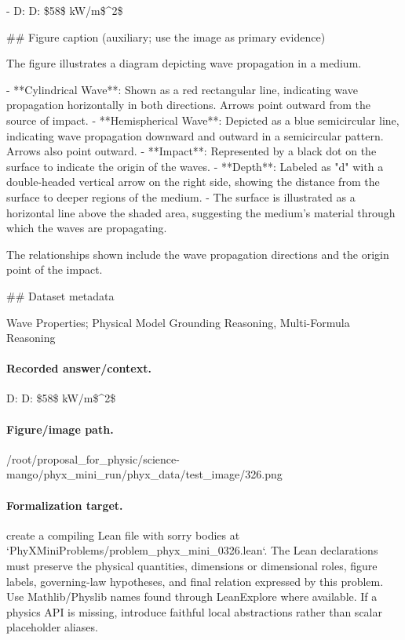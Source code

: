 - D: D: \$58\$ kW/m\$\textasciicircum{}2\$

\#\# Figure caption (auxiliary; use the image as primary evidence)

The figure illustrates a diagram depicting wave propagation in a medium.

- **Cylindrical Wave**: Shown as a red rectangular line, indicating wave propagation horizontally in both directions. Arrows point outward from the source of impact.
- **Hemispherical Wave**: Depicted as a blue semicircular line, indicating wave propagation downward and outward in a semicircular pattern. Arrows also point outward.
- **Impact**: Represented by a black dot on the surface to indicate the origin of the waves.
- **Depth**: Labeled as "d" with a double-headed vertical arrow on the right side, showing the distance from the surface to deeper regions of the medium.
- The surface is illustrated as a horizontal line above the shaded area, suggesting the medium's material through which the waves are propagating.

The relationships shown include the wave propagation directions and the origin point of the impact.

\#\# Dataset metadata

Wave Properties; Physical Model Grounding Reasoning, Multi-Formula Reasoning

\paragraph{Recorded answer/context.}
D: D: \$58\$ kW/m\$\textasciicircum{}2\$

\paragraph{Figure/image path.}
/root/proposal\_for\_physic/science-mango/phyx\_mini\_run/phyx\_data/test\_image/326.png

\paragraph{Formalization target.}
create a compiling Lean file with sorry bodies at `PhyXMiniProblems/problem\_phyx\_mini\_0326.lean`. The Lean declarations must preserve the physical quantities, dimensions or dimensional roles, figure labels, governing-law hypotheses, and final relation expressed by this problem.
Use Mathlib/Physlib names found through LeanExplore where available. If a physics API is missing, introduce faithful local abstractions rather than scalar placeholder aliases.

